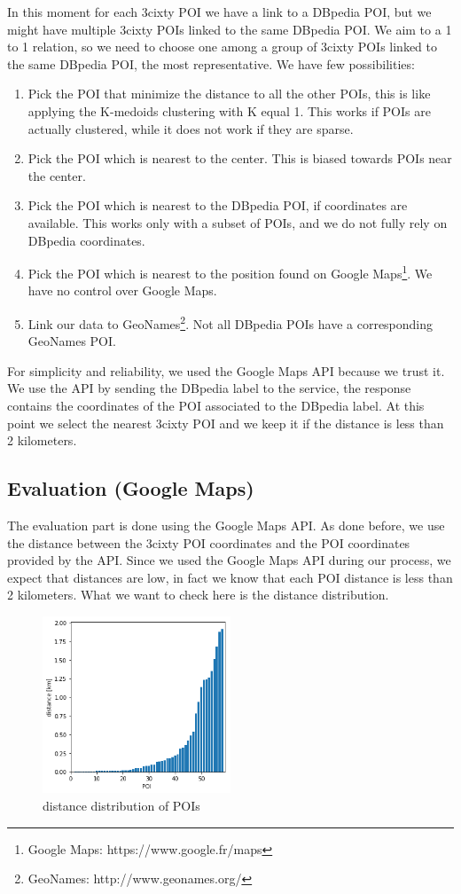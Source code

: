\documentclass[paper=a4, fontsize=11pt]{scrartcl}
\begin{document}
In this moment for each 3cixty POI we have a link to a DBpedia POI, but we might have multiple 3cixty POIs linked to the same DBpedia POI. We aim to a 1 to 1 relation, so we need to choose one among a group of 3cixty POIs linked to the same DBpedia POI, the most representative.
We have few possibilities:
\begin{enumerate}
\item Pick the POI that minimize the distance to all the other POIs, this is like applying the K-medoids clustering with K equal 1. This works if POIs are actually clustered, while it does not work if they are sparse.
\item Pick the POI which is nearest to the center. This is biased towards POIs near the center.
\item Pick the POI which is nearest to the DBpedia POI, if coordinates are available. This works only with a subset of POIs, and we do not fully rely on DBpedia coordinates.
\item Pick the POI which is nearest to the position found on Google Maps\footnote{Google Maps: https://www.google.fr/maps}. We have no control over Google Maps.
\item Link our data to GeoNames\footnote{GeoNames: http://www.geonames.org/}. Not all DBpedia POIs have a corresponding GeoNames POI.
\end{enumerate}
For simplicity and reliability, we used the Google Maps API because we trust it.
We use the API by sending the DBpedia label to the service, the response contains the coordinates of the POI associated to the DBpedia label. At this point we select the nearest 3cixty POI and we keep it if the distance is less than 2 kilometers.
\subsection{Evaluation (Google Maps)}
The evaluation part is done using the Google Maps API. As done before, we use the distance between the 3cixty POI coordinates and the POI coordinates provided by the API. Since we used the Google Maps API during our process, we expect that distances are low, in fact we know that each POI distance is less than 2 kilometers. What we want to check here is the distance distribution.

\begin{figure}[!htb]
  \centering 
    \includegraphics[width=0.5\textwidth]{images/distance.png}
    \caption{distance distribution of POIs}
    \label{fig:poidist}
\end{figure}
\end{document}
